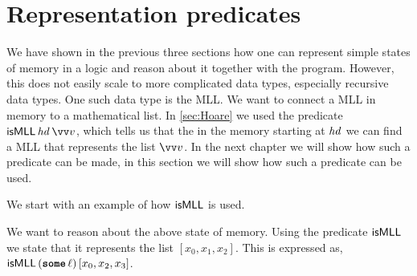 \documentclass[thesis.tex]{subfiles}
\begin{document}
\section{Representation predicates}
\label{sec:represpreds}
We have shown in the previous three sections how one can represent simple states of memory in a logic and reason about it together with the program. However, this does not easily scale to more complicated data types, especially recursive data types. One such data type is the MLL. We want to connect a MLL in memory to a mathematical list. In \cref*{sec:Hoare} we used the predicate $\isMLL\, \langv{hd}\, \vect{v}$, which tells us that the in the memory starting at $\mathit{hd}$ we can find a MLL that represents the list $\vect{\val}$. In the next chapter we will show how such a predicate can be made, in this section we will show how such a predicate can be used.

We start with an example of how $\textsf{\upshape isMLL}$ is used.
\begin{center}
\end{center}
We want to reason about the above state of memory. Using the predicate $\textsf{\upshape isMLL}$ we state that it represents the list $[x_0, x_1, x_2]$. This is expressed as, $\textsf{\upshape isMLL}\,(\operatorname{\texttt{\bfseries some}}\ell)\,[x_0,x_2,x_3]$.
\end{document}
